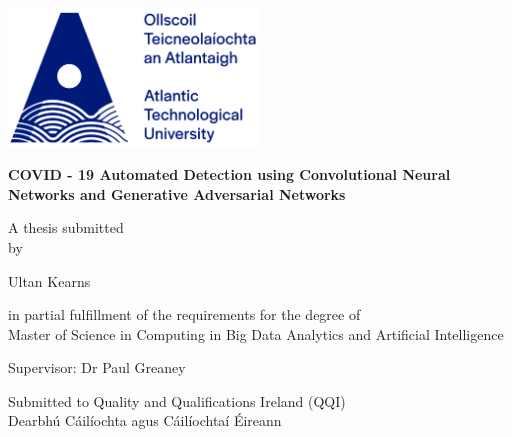 \documentclass[a4paper,11pt]{report}
\begin{document}
\begin{titlepage}
    \begin{center}

    \vspace{30pt}
    \includegraphics[width=0.5\textwidth]{figures/ATULogo.png}\\
    \vspace{50pt}
    
    \fontsize{14}{20} \selectfont
    
    \textbf{\Huge COVID - 19 Automated Detection using Convolutional Neural Networks and Generative Adversarial Networks} 
    \vspace{40pt}
    
    A thesis submitted \\
    by\\
    \vspace{15pt}
    
    {\huge Ultan Kearns}\\
    \vspace{15pt}
    
     in partial fulfillment of the requirements for the degree of\\ Master of Science in Computing in Big Data Analytics and Artificial Intelligence
    \vspace{40pt}

    
    
    Supervisor: Dr Paul Greaney
    \vspace{100pt}
    
    
Submitted to Quality and Qualifications Ireland (QQI) \\
Dearbhú Cáilíochta agus Cáilíochtaí Éireann
    \centerline{\monthname \quad \the\year}
\end{center}    
\end{titlepage}

\onehalfspace


\setcounter{page}{1}


\tableofcontents
{}
\end{document}
